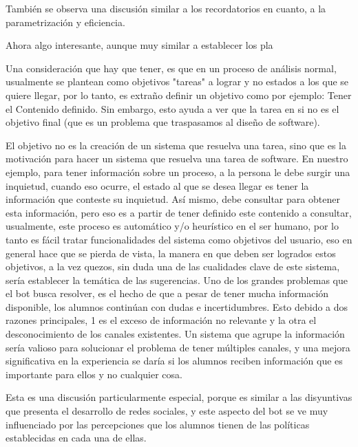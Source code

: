         \par También se observa una discusión similar a los recordatorios en cuanto, a la parametrización y eficiencia.
        \par Ahora algo interesante, aunque muy similar a establecer los pla       \par Una consideración que hay que tener, es que en un proceso de análisis normal, usualmente se plantean como objetivos "tareas" a lograr y no estados a los que se quiere llegar, por lo tanto, es extraño definir un objetivo como por ejemplo: Tener el Contenido definido. Sin embargo, esto ayuda a ver que la tarea en si no es el objetivo final (que es un problema que traspasamos al diseño de software). 
        \par El objetivo no es la creación de un sistema que resuelva una tarea, sino que es la motivación para hacer un sistema que resuelva una tarea de software. En nuestro ejemplo, para tener información sobre un proceso, a la persona le debe surgir una inquietud, cuando eso ocurre, el estado al que se desea llegar es tener la información que conteste su inquietud. Así mismo, debe consultar para obtener esta información, pero eso es a partir de tener definido este contenido a consultar, usualmente, este proceso es automático y/o heurístico en el ser humano, por lo tanto es fácil tratar funcionalidades del sistema como objetivos del usuario, eso en general hace que se pierda de vista, la manera en que deben ser logrados estos objetivos, a la vez quezos, sin duda una de las cualidades clave de este sistema, sería establecer la temática de las sugerencias. Uno de los grandes problemas que el bot busca resolver, es el hecho de que a pesar de tener mucha información disponible, los alumnos continúan con dudas e incertidumbres. Esto debido a dos razones principales, 1 es el exceso de información no relevante y la otra el desconocimiento de los canales existentes. Un sistema que agrupe la información sería valioso para solucionar el problema de tener múltiples canales, y una mejora significativa en la experiencia se daría si los alumnos reciben información que es importante para ellos y no cualquier cosa.
        \par Esta es una discusión particularmente especial, porque es similar a las disyuntivas que presenta el desarrollo de redes sociales, y este aspecto del bot se ve muy influenciado por las percepciones que los alumnos tienen de las políticas establecidas en cada una de ellas.

